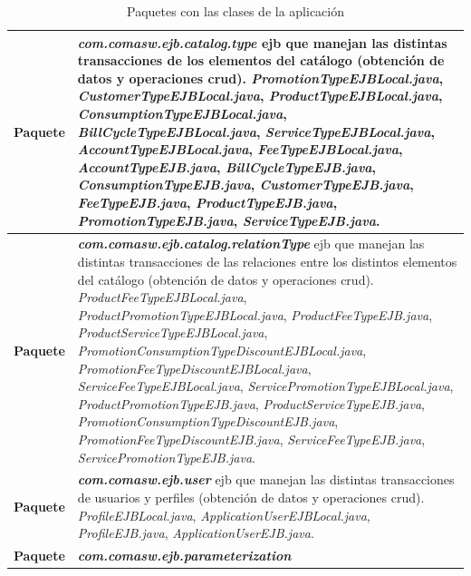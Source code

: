 \begin{longtable}{m{3cm} m{12cm}}
    \caption{Paquetes con las clases de la aplicación}
    \label{tab:paquetes}\\
    \rowcolors{2}{white}{white}
    \textbf{Paquete} & \textit{\textbf{com.comasw.ejb.catalog.type}} \newline
    \acrshort{ejb} que manejan las distintas transacciones de los elementos del catálogo (obtención de datos y operaciones \acrshort{crud}).\newline
\textit{PromotionTypeEJBLocal.java},
\textit{CustomerTypeEJBLocal.java},
\textit{ProductTypeEJBLocal.java},
\textit{ConsumptionTypeEJBLocal.java},
\textit{BillCycleTypeEJBLocal.java},
\textit{ServiceTypeEJBLocal.java},
\textit{AccountTypeEJBLocal.java},
\textit{FeeTypeEJBLocal.java},
\textit{AccountTypeEJB.java},
\textit{BillCycleTypeEJB.java},
\textit{ConsumptionTypeEJB.java},
\textit{CustomerTypeEJB.java},
\textit{FeeTypeEJB.java},
\textit{ProductTypeEJB.java},
\textit{PromotionTypeEJB.java},
\textit{ServiceTypeEJB.java}.
    \\\hline
    \textbf{Paquete} & \textit{\textbf{com.comasw.ejb.catalog.relationType}} \newline
     \acrshort{ejb} que manejan las distintas transacciones de las relaciones entre los distintos elementos del catálogo (obtención de datos y operaciones \acrshort{crud}).\newline
\textit{ProductFeeTypeEJBLocal.java},
\textit{ProductPromotionTypeEJBLocal.java},
\textit{ProductFeeTypeEJB.java},
\textit{ProductServiceTypeEJBLocal.java},
\textit{PromotionConsumptionTypeDiscountEJBLocal.java},
\textit{PromotionFeeTypeDiscountEJBLocal.java},
\textit{ServiceFeeTypeEJBLocal.java},
\textit{ServicePromotionTypeEJBLocal.java},
\textit{ProductPromotionTypeEJB.java},
\textit{ProductServiceTypeEJB.java},
\textit{PromotionConsumptionTypeDiscountEJB.java},
\textit{PromotionFeeTypeDiscountEJB.java},
\textit{ServiceFeeTypeEJB.java},
\textit{ServicePromotionTypeEJB.java}.
	\\\hline
	\textbf{Paquete} & \textit{\textbf{com.comasw.ejb.user}} \newline
     \acrshort{ejb} que manejan las distintas transacciones de usuarios y perfiles (obtención de datos y operaciones \acrshort{crud}).\newline
\textit{ProfileEJBLocal.java},
\textit{ApplicationUserEJBLocal.java},
\textit{ProfileEJB.java},
\textit{ApplicationUserEJB.java}.
	\\\hline
	\textbf{Paquete} & \textit{\textbf{com.comasw.ejb.parameterization}} \newline

\end{longtable}
